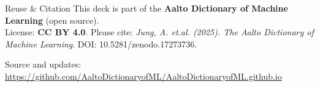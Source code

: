 \documentclass[12pt]{beamer}
\begin{document}
\begin{frame}{Reuse \& Citation}
	\small
	This deck is part of the \textbf{Aalto Dictionary of Machine Learning} (open source).\\
	License: \textbf{CC BY 4.0}. Please cite:
	\emph{Jung, A. et.al. (2025). The Aalto Dictionary of Machine Learning}. DOI: 10.5281/zenodo.17273736.
	
	\medskip
	Source and updates: \url{https://github.com/AaltoDictionaryofML/AaltoDictionaryofML.github.io}
\end{frame}
\end{document}
